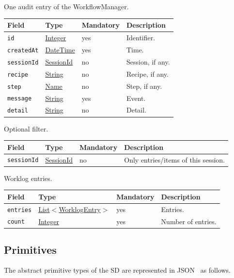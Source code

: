 \documentclass[a4paper]{arrowhead}
\newcommand{\mref}[1]{{\textcolor{ArrowheadPurple}{\hyperref[sec:model:#1]{#1}}}}
\newcommand{\pref}[1]{{\textcolor{ArrowheadGrey}{\hyperref[sec:model:primitives:#1]{#1}}}}
\begin{document}
One audit entry of the WorkflowManager.

{\small
\begin{longtable}{|p{3.7cm}|p{4.2cm}|p{1.6cm}|p{6.3cm}|}

\hline
\rowcolor{gray!33} Field & Type & Mandatory & Description \\ \hline
\endhead
\texttt{id} & \pref{Integer} & yes & Identifier. \\ \hline
\texttt{createdAt} & \pref{DateTime} & yes & Time. \\ \hline
\texttt{sessionId} & \pref{SessionId} & no & Session, if any. \\ \hline
\texttt{recipe} & \pref{String} & no & Recipe, if any. \\ \hline
\texttt{step} & \pref{Name} & no & Step, if any. \\ \hline
\texttt{message} & \pref{String} & yes & Event. \\ \hline
\texttt{detail} & \pref{String} & no & Detail. \\ \hline
\end{longtable}
}

Optional filter.

{\small
\begin{longtable}{|p{3.7cm}|p{4.2cm}|p{1.6cm}|p{6.3cm}|}

\hline
\rowcolor{gray!33} Field & Type & Mandatory & Description \\ \hline
\endhead
\texttt{sessionId} & \pref{SessionId} & no & Only entries/items of this session. \\ \hline
\end{longtable}
}

Worklog entries.

{\small
\begin{longtable}{|p{3.7cm}|p{4.2cm}|p{1.6cm}|p{6.3cm}|}

\hline
\rowcolor{gray!33} Field & Type & Mandatory & Description \\ \hline
\endhead
\texttt{entries} & \pref{List}$<$\mref{WorklogEntry}$>$ & yes & Entries. \\ \hline
\texttt{count} & \pref{Integer} & yes & Number of entries. \\ \hline
\end{longtable}
}


\subsection{Primitives}
\label{sec:model:primitives}
The abstract primitive types of the SD are represented in JSON~\cite{rfc8259} as follows.
\end{document}
